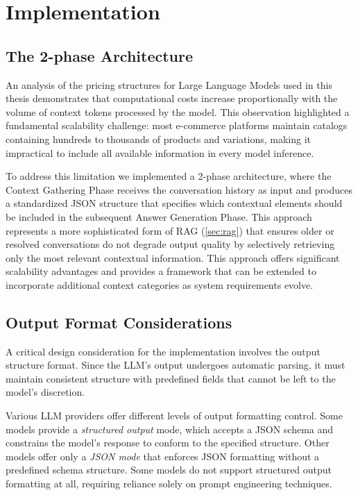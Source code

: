 \chapter{Implementation}
\label{cha:impl}


\section{The 2-phase Architecture}

An analysis of the pricing structures for Large Language Models used in this thesis \cite{gemini_pricing, anthropic_pricing, deepseek_pricing, openai_pricing} demonstrates that computational costs increase proportionally with the volume of context tokens processed by the model.
This observation highlighted a fundamental scalability challenge: most e-commerce platforms maintain catalogs containing hundreds to thousands of products and variations, making it impractical to include all available information in every model inference.

To address this limitation we implemented a 2-phase architecture, where the Context Gathering Phase receives the conversation history as input and produces a standardized JSON structure that specifies which contextual elements should be included in the subsequent Answer Generation Phase.
This approach represents a more sophisticated form of RAG (\cref{sec:rag}) that ensures older or resolved conversations do not degrade output quality by selectively retrieving only the most relevant contextual information.
This approach offers significant scalability advantages and provides a framework that can be extended to incorporate additional context categories as system requirements evolve.

\section{Output Format Considerations}

A critical design consideration for the implementation involves the output structure format. Since the LLM's output undergoes automatic parsing, it must maintain consistent structure with predefined fields that cannot be left to the model's discretion.

Various LLM providers offer different levels of output formatting control. Some models provide a \textit{structured output} mode, which accepts a JSON schema and constrains the model's response to conform to the specified structure. Other models offer only a \textit{JSON mode} that enforces JSON formatting without a predefined schema structure.
Some models do not support structured output formatting at all, requiring reliance solely on prompt engineering techniques.

